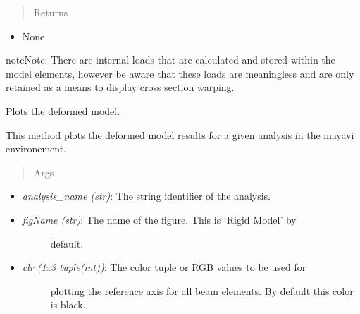 \documentclass[letterpaper,10pt,english]{sphinxmanual}
\begin{document}
\begin{fulllineitems}
\begin{fulllineitems}
\begin{itemize}
\begin{description}
\end{description}

\end{itemize}
\begin{quote}\begin{description}
\item[{Returns}] \leavevmode
\end{description}\end{quote}
\begin{itemize}
\item {} 
None

\end{itemize}

\begin{notice}{note}{Note:}
There are internal loads that are calculated and stored
within the model elements, however be aware that these loads are
meaningless and are only retained as a means to display cross
section warping.
\end{notice}

\end{fulllineitems}


\begin{fulllineitems}
\label{FEM:AeroComBAT.FEM.Model.plotDeformedModel}
Plots the deformed model.

This method plots the deformed model results for a given analysis in
the mayavi environement.
\begin{quote}\begin{description}
\item[{Args}] \leavevmode
\end{description}\end{quote}
\begin{itemize}
\item {} 
\emph{analysis\_name (str)}: The string identifier of the analysis.

\item {} \begin{description}
\item[{\emph{figName (str)}: The name of the figure. This is `Rigid Model' by}] \leavevmode
default.

\end{description}

\item {} \begin{description}
\item[{\emph{clr (1x3 tuple(int))}: The color tuple or RGB values to be used for}] \leavevmode
plotting the reference axis for all beam elements. By default this
color is black.


\end{description}
\end{itemize}
\end{fulllineitems}
\end{fulllineitems}
\end{document}
